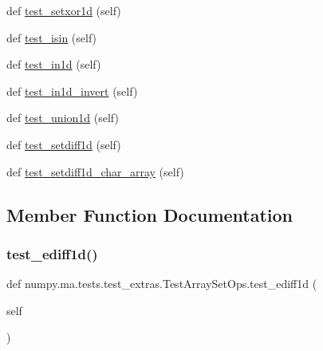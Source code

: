 \begin{DoxyCompactItemize}
def \hyperlink{classnumpy_1_1ma_1_1tests_1_1test__extras_1_1TestArraySetOps_adb8fae655663e156314dc634b204d1c8}{test\+\_\+setxor1d} (self)
\item 
def \hyperlink{classnumpy_1_1ma_1_1tests_1_1test__extras_1_1TestArraySetOps_ae9a136895de74a3b0b2b9cbfba44ab41}{test\+\_\+isin} (self)
\item 
def \hyperlink{classnumpy_1_1ma_1_1tests_1_1test__extras_1_1TestArraySetOps_a8b82a69ebca0e310137a8455efcff79e}{test\+\_\+in1d} (self)
\item 
def \hyperlink{classnumpy_1_1ma_1_1tests_1_1test__extras_1_1TestArraySetOps_a1807810aaf3fc09c4ccbf044d6bfbab4}{test\+\_\+in1d\+\_\+invert} (self)
\item 
def \hyperlink{classnumpy_1_1ma_1_1tests_1_1test__extras_1_1TestArraySetOps_a0e333a5d4f99d6d237842e5006ca4baf}{test\+\_\+union1d} (self)
\item 
def \hyperlink{classnumpy_1_1ma_1_1tests_1_1test__extras_1_1TestArraySetOps_a96c7f4c6d184cea40cf6b0a216f3538c}{test\+\_\+setdiff1d} (self)
\item 
def \hyperlink{classnumpy_1_1ma_1_1tests_1_1test__extras_1_1TestArraySetOps_ad41dbc0585370dd7964052a26b6a5a62}{test\+\_\+setdiff1d\+\_\+char\+\_\+array} (self)
\end{DoxyCompactItemize}


\subsection{Member Function Documentation}
\mbox{\label{classnumpy_1_1ma_1_1tests_1_1test__extras_1_1TestArraySetOps_a98c404aca51dc59c137be122497f3a53}} 
\subsubsection{\texorpdfstring{test\+\_\+ediff1d()}{test\_ediff1d()}}
{\footnotesize\ttfamily def numpy.\+ma.\+tests.\+test\+\_\+extras.\+Test\+Array\+Set\+Ops.\+test\+\_\+ediff1d (\begin{DoxyParamCaption}\item[{}]{self }\end{DoxyParamCaption})}

